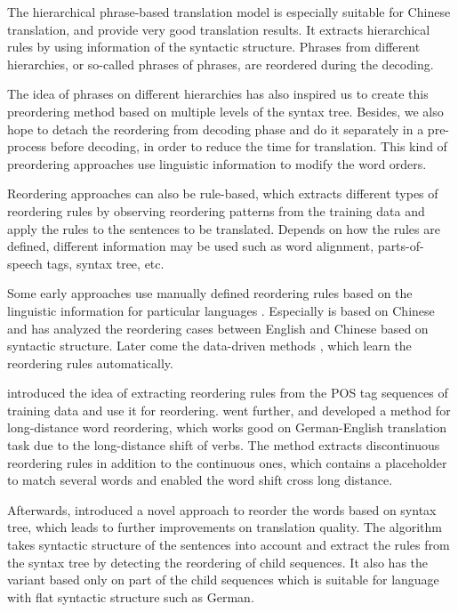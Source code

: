 The hierarchical phrase-based translation model \citep{hier} is especially suitable for Chinese translation, and provide very good translation results. It extracts hierarchical rules by using information of the syntactic structure. Phrases from different hierarchies, or so-called phrases of phrases, are reordered during the decoding. 

The idea of phrases on different hierarchies has also inspired us to create this preordering method based on multiple levels of the syntax tree. Besides, we also hope to detach the reordering from decoding phase and do it separately in a pre-process before decoding, in order to reduce the time for translation. This kind of preordering approaches use linguistic information to modify the word orders. 

Reordering approaches can also be rule-based, which extracts different types of reordering rules by observing reordering patterns from the training data and apply the rules to the sentences to be translated. Depends on how the rules are defined, different information may be used such as word alignment, parts-of-speech tags, syntax tree, etc.

Some early approaches use manually defined reordering rules based on the linguistic information for particular languages \citep{collins2005clause, popovic2006pos,habash2007syntactic}. Especially \cite{syntactic} is based on Chinese and has analyzed the reordering cases between English and Chinese based on syntactic structure. Later come the data-driven methods \citep{zhang2007chunk, crego2008using}, which learn the reordering rules automatically. 

\cite{short} introduced the idea of extracting reordering rules from the POS tag sequences of training data and use it for reordering. \cite{long} went further, and developed a method for long-distance word reordering, which works good on German-English translation task due to the long-distance shift of verbs. The method extracts discontinuous reordering rules in addition to the continuous ones, which contains a placeholder to match several words and enabled the word shift cross long distance.

Afterwards, \cite{tree} introduced a novel approach to reorder the words based on syntax tree, which leads to further improvements on translation quality. The algorithm takes syntactic structure of the sentences into account and extract the rules from the syntax tree by detecting the reordering of child sequences. It also has the variant based only on part of the child sequences which is suitable for language with flat syntactic structure such as German.

